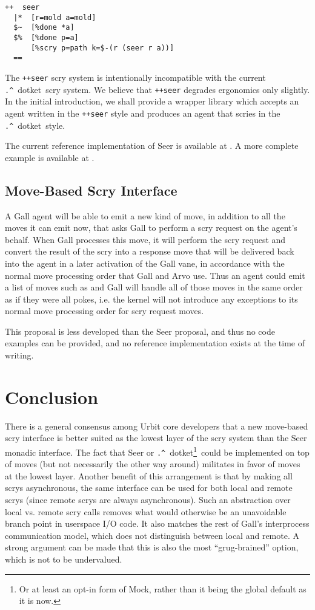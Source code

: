 \documentclass[twoside]{article}
\newcommand{\dotket}{\texttt{\string.\string^}~dotket}
\begin{document}
\begin{lstlisting}
++  seer
  |*  [r=mold a=mold]
  $~  [%done *a]
  $%  [%done p=a]
      [%scry p=path k=$-(r (seer r a))]
  ==
\end{lstlisting}

The \texttt{++seer} scry system is intentionally incompatible with the current \dotket~scry system.  We believe that \texttt{++seer} degrades ergonomics only slightly.  In the initial introduction, we shall provide a wrapper library which accepts an agent written in the \texttt{++seer} style and produces an agent that scries in the \dotket~style.

The current reference implementation of Seer is available at \citet{Levan2023}.  A more complete example is available at \citet{Levan2023a}.

\subsection{Move-Based Scry Interface}

A Gall agent will be able to emit a new kind of move, in addition to all the moves it can emit now, that asks Gall to perform a scry request on the agent's behalf.  When Gall processes this move, it will perform the scry request and convert the result of the scry into a response move that will be delivered back into the agent in a later activation of the Gall vane, in accordance with the normal move processing order that Gall and Arvo use.  Thus an agent could emit a list of moves such as \texttt{} and Gall will handle all of those moves in the same order as if they were all pokes, i.e. the kernel will not introduce any exceptions to its normal move processing order for scry request moves.

This proposal is less developed than the Seer proposal, and thus no code examples can be provided, and no reference implementation exists at the time of writing.


\section{Conclusion}

There is a general consensus among Urbit core developers that a new move-based scry interface is better suited as the lowest layer of the scry system than the Seer monadic interface.  The fact that Seer or \dotket\footnote{Or at least an opt-in form of Mock, rather than it being the global default as it is now.}~could be implemented on top of moves (but not necessarily the other way around) militates in favor of moves at the lowest layer.  Another benefit of this arrangement is that by making all scrys asynchronous, the same interface can be used for both local and remote scrys (since remote scrys are always asynchronous).  Such an abstraction over local vs. remote scry calls removes what would otherwise be an unavoidable branch point in userspace I/O code.  It also matches the rest of Gall's interprocess communication model, which does not distinguish between local and remote.  A strong argument can be made that this is also the most ``grug-brained'' option, which is not to be undervalued.
\end{document}
